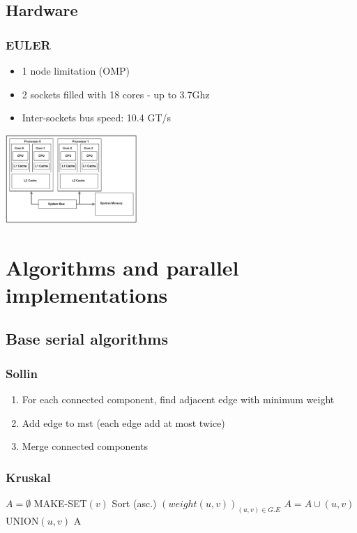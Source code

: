 \documentclass{beamer}
\begin{document}
\subsection{Hardware}

\begin{frame}
\frametitle{EULER}
\centering

\begin{itemize}
\item 1 node limitation (OMP)
\item 2 sockets filled with 18 cores - up to 3.7Ghz
\item Inter-sockets bus speed: 10.4 GT/s
\end{itemize}

\includegraphics[width=5cm]{dual_sockets_caches.png}
\end{frame}



\section{Algorithms and parallel implementations}

\subsection{Base serial algorithms}

\begin{frame}[fragile]
\frametitle{Sollin}
\begin{enumerate}
	\item For each connected component, find adjacent edge with minimum weight
	\item Add edge to mst (each edge add at most twice)
	\item Merge connected components
\end{enumerate}
\end{frame}

\begin{frame}[fragile]
\frametitle{Kruskal}
\small
\begin{algorithm}[H]
\begin{algorithmic}[1]
\STATE $A = \emptyset$
\STATE MAKE-SET$(v)$
\ENDFOR
\STATE Sort (asc.) $\left(weight(u, v)\right)_{(u, v) \in G.E}$
\STATE $A = A \cup {(u, v)}$
\STATE UNION$(u, v)$
\ENDIF
\ENDFOR
\RETURN A
\end{algorithmic}
\end{algorithm}


\end{frame}
\end{document}
